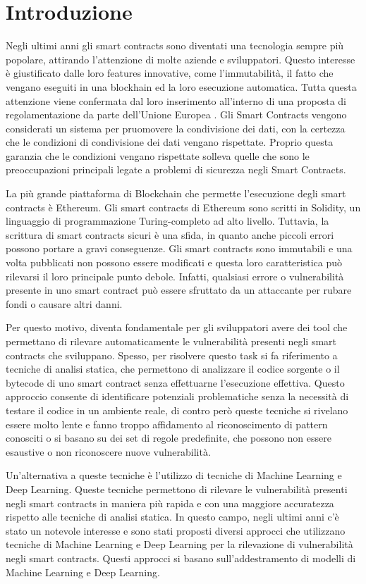 \documentclass[../../Thesis.tex]{subfiles}
\begin{document}
\chapter{Introduzione}
Negli ultimi anni gli smart contracts sono diventati una tecnologia sempre più popolare, attirando l'attenzione di molte aziende e sviluppatori. Questo interesse è giustificato dalle loro features innovative, come l'immutabilità, il fatto che vengano eseguiti in una blockhain ed la loro esecuzione automatica. 
Tutta questa attenzione viene confermata dal loro inserimento all'interno di una proposta di regolamentazione da parte dell'Unione Europea \cite{DataAct}. Gli Smart Contracts vengono considerati un sistema per pruomovere la condivisione dei dati, con la certezza che le condizioni di condivisione dei dati vengano rispettate. Proprio questa garanzia che le condizioni vengano rispettate solleva quelle che sono le preoccupazioni principali legate a problemi di sicurezza negli Smart Contracts.

La più grande piattaforma di Blockchain che permette l'esecuzione degli smart contracts è Ethereum. Gli smart contracts di Ethereum sono scritti in Solidity, un linguaggio di programmazione Turing-completo ad alto livello. Tuttavia, la scrittura di smart contracts sicuri è una sfida, in quanto anche piccoli errori possono portare a gravi conseguenze. Gli smart contracts sono immutabili e una volta pubblicati non possono essere modificati e questa loro caratteristica può rilevarsi il loro principale punto debole. Infatti, qualsiasi errore o vulnerabilità presente in uno smart contract può essere sfruttato da un attaccante per rubare fondi o causare altri danni.

Per questo motivo, diventa fondamentale per gli sviluppatori avere dei tool che permettano di rilevare automaticamente le vulnerabilità presenti negli smart contracts che sviluppano. Spesso, per risolvere questo task si fa riferimento a tecniche di analisi statica, che permettono di analizzare il codice sorgente o il bytecode di uno smart contract senza effettuarne l'esecuzione effettiva. Questo approccio consente di identificare potenziali problematiche senza la necessità di testare il codice in un ambiente reale, di contro però queste tecniche si rivelano essere molto lente e fanno troppo affidamento al riconoscimento di pattern conosciti o si basano su dei set di regole predefinite, che possono non essere esaustive o non riconoscere nuove vulnerabilità. 

Un'alternativa a queste tecniche è l'utilizzo di tecniche di Machine Learning e Deep Learning. Queste tecniche permettono di rilevare le vulnerabilità presenti negli smart contracts in maniera più rapida e con una maggiore accuratezza rispetto alle tecniche di analisi statica. In questo campo, negli ultimi anni c'è stato un notevole interesse e sono stati proposti diversi approcci che utilizzano tecniche di Machine Learning e Deep Learning per la rilevazione di vulnerabilità negli smart contracts. Questi approcci si basano sull'addestramento di modelli di Machine Learning e Deep Learning. 
\end{document}
